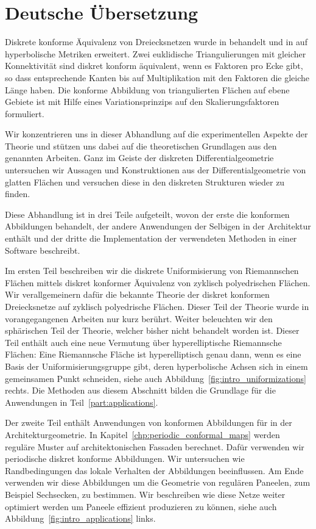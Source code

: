 \documentclass[Thesis.tex]{subfiles}
\begin{document}
\section*{Deutsche \"{U}bersetzung}
Diskrete konforme \"{A}quivalenz von Dreiecksnetzen wurde in \cite{Springborn2008} behandelt und in \cite{Bobenko2010} auf hyperbolische Metriken erweitert.
Zwei euklidische Triangulierungen mit gleicher Konnektivit\"{a}t sind diskret konform \"{a}quivalent, wenn es  Faktoren pro Ecke gibt, so dass entsprechende Kanten bis auf Multiplikation mit den Faktoren die gleiche L\"{a}nge haben.
Die konforme Abbildung von triangulierten Fl\"{a}chen auf ebene Gebiete ist mit Hilfe eines Variationsprinzips auf den Skalierungsfaktoren formuliert.

Wir konzentrieren uns in dieser Abhandlung auf die experimentellen Aspekte der Theorie und st\"{u}tzen uns dabei auf die theoretischen Grundlagen aus den genannten Arbeiten.
Ganz im Geiste der diskreten Differentialgeometrie untersuchen wir Aussagen und Konstruktionen aus der Differentialgeometrie von glatten Fl\"{a}chen und versuchen diese in den diskreten Strukturen wieder zu finden.

Diese Abhandlung ist in drei Teile aufgeteilt, wovon der erste die konformen Abbildungen behandelt, der andere Anwendungen der Selbigen in der Architektur enth\"{a}lt und der dritte die Implementation der verwendeten Methoden in einer Software beschreibt.

Im ersten Teil beschreiben wir die diskrete Uniformisierung von Riemannschen Fl\"{a}chen mittels diskret konformer \"{A}quivalenz von zyklisch polyedrischen Fl\"{a}chen.
Wir verallgemeinern daf\"{u}r die bekannte Theorie der diskret konformen Dreiecksnetze auf zyklisch polyedrische Fl\"{a}chen.
Dieser Teil der Theorie wurde in vorangegangenen Arbeiten nur kurz ber\"{u}hrt.
Weiter beleuchten wir den sph\"{a}rischen Teil der Theorie, welcher bisher nicht behandelt worden ist.
Dieser Teil enth\"{a}lt auch eine neue Vermutung \"{u}ber hyperelliptische Riemannsche Fl\"{a}chen: 
Eine Riemannsche Fl\"{a}che ist hyperelliptisch genau dann, wenn es eine Basis der Uniformisierungsgruppe gibt, deren hyperbolische Achsen sich in einem gemeinsamen Punkt schneiden, siehe auch Abbildung~\ref{fig:intro_uniformizations} rechts.
Die Methoden aus diesem Abschnitt bilden die Grundlage f\"{u}r die Anwendungen in Teil~\ref{part:applications}.

Der zweite Teil enth\"{a}lt Anwendungen von konformen Abbildungen f\"{u}r in der Architekturgeometrie.
In Kapitel~\ref{chp:periodic_conformal_maps} werden regul\"{a}re Muster auf architektonischen Fassaden berechnet.
Daf\"{u}r verwenden wir periodische diskret konforme Abbildungen.
Wir untersuchen wie Randbedingungen das lokale Verhalten der Abbildungen beeinflussen.
Am Ende verwenden wir diese Abbildungen um die Geometrie von regul\"{a}ren Paneelen, zum Beispiel Sechsecken, zu bestimmen. 
Wir beschreiben wie diese Netze weiter optimiert werden um Paneele effizient produzieren zu k\"{o}nnen, siehe auch Abbildung~\ref{fig:intro_applications} links.
\end{document}
